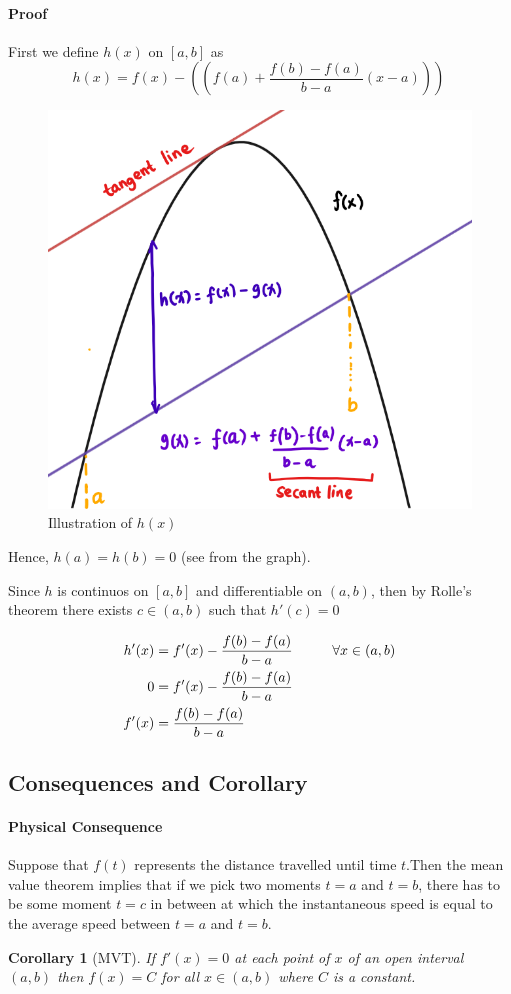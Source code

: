 \documentclass[12pt]{article}
\newcommand\tab[1][1cm]{\hspace*{#1}}
\newtheorem{corollary}{Corollary}
\begin{document}
\paragraph{Proof}
First we define $h(x)$ on $[a,b]$ as
\[
  h(x) = f(x) - ((f(a) + \frac{f(b) - f(a)}{b - a}(x - a) ))\, 
\]
\begin{figure} [h!]
    \centering
    \includegraphics[width = 0.35\linewidth]{Images/mvt proof.png}
    \caption{Illustration of $h(x)$}
\end{figure}
Hence, $h(a) = h(b) = 0$ (see from the graph).

Since $h$ is continuos on $[a,b]$ and differentiable on $(a,b)$, then by 
Rolle's theorem there exists $c \in (a,b)$ such that $h'(c) = 0$

\begin{align*} 
     h'(x) &= f'(x) - \frac{f(b) - f(a)}{b - a}  \textrm{\tab} \forall x \in (a,b)\\
    0 &= f'(x) - \frac{f(b) - f(a)}{b - a}\\
    f'(x) &= \frac{f(b) - f(a)}{b - a} \\
\end{align*}

\subsection{Consequences and Corollary}
\paragraph{Physical Consequence}
Suppose that $f(t)$ represents the distance travelled until time $t$.Then the mean value 
theorem implies that if we pick two moments $t = a$ and $t = b$, there has to be some moment 
$t = c$ in between at which the instantaneous speed is equal to the average speed between $t = a$ and $t = b$.

\begin{corollary}[MVT] 
     If $f'(x) = 0$ at each point of $x$ of an open interval  $(a,b)$ then $f(x) = C$ 
     for all $x \in (a,b)$ where $C$ is a constant.
\end{corollary}
\end{document}
